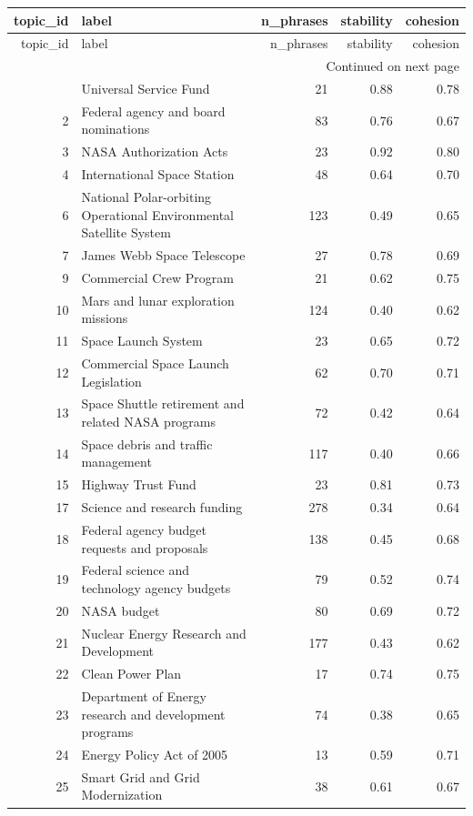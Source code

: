 \begin{longtable}{rlrrr}
\toprule
topic_id & label & n_phrases & stability & cohesion \\
\midrule
\endfirsthead
\toprule
topic_id & label & n_phrases & stability & cohesion \\
\midrule
\endhead
\midrule
\multicolumn{5}{r}{Continued on next page} \\
\midrule
\endfoot
\bottomrule
\endlastfoot
1 & Universal Service Fund & 21 & 0.88 & 0.78 \\
2 & Federal agency and board nominations & 83 & 0.76 & 0.67 \\
3 & NASA Authorization Acts & 23 & 0.92 & 0.80 \\
4 & International Space Station & 48 & 0.64 & 0.70 \\
6 & National Polar-orbiting Operational Environmental Satellite System & 123 & 0.49 & 0.65 \\
7 & James Webb Space Telescope & 27 & 0.78 & 0.69 \\
9 & Commercial Crew Program & 21 & 0.62 & 0.75 \\
10 & Mars and lunar exploration missions & 124 & 0.40 & 0.62 \\
11 & Space Launch System & 23 & 0.65 & 0.72 \\
12 & Commercial Space Launch Legislation & 62 & 0.70 & 0.71 \\
13 & Space Shuttle retirement and related NASA programs & 72 & 0.42 & 0.64 \\
14 & Space debris and traffic management & 117 & 0.40 & 0.66 \\
15 & Highway Trust Fund & 23 & 0.81 & 0.73 \\
17 & Science and research funding & 278 & 0.34 & 0.64 \\
18 & Federal agency budget requests and proposals & 138 & 0.45 & 0.68 \\
19 & Federal science and technology agency budgets & 79 & 0.52 & 0.74 \\
20 & NASA budget & 80 & 0.69 & 0.72 \\
21 & Nuclear Energy Research and Development & 177 & 0.43 & 0.62 \\
22 & Clean Power Plan & 17 & 0.74 & 0.75 \\
23 & Department of Energy research and development programs & 74 & 0.38 & 0.65 \\
24 & Energy Policy Act of 2005 & 13 & 0.59 & 0.71 \\
25 & Smart Grid and Grid Modernization & 38 & 0.61 & 0.67 \\

\end{longtable}
